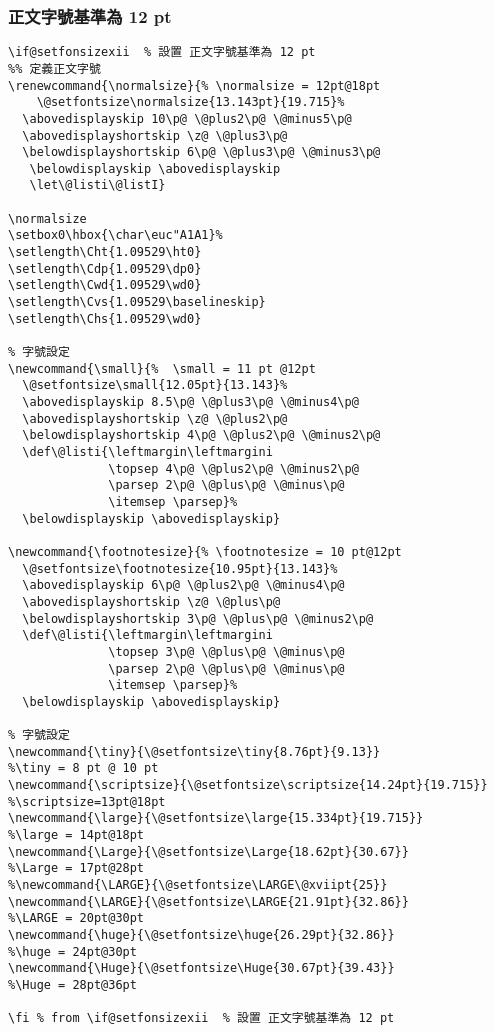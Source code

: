 \subsubsection{正文字號基準為 12 pt}
\begin{lstlisting}[firstnumber=363]
\if@setfonsizexii  % 設置 正文字號基準為 12 pt
%% 定義正文字號
\renewcommand{\normalsize}{% \normalsize = 12pt@18pt
    \@setfontsize\normalsize{13.143pt}{19.715}%
  \abovedisplayskip 10\p@ \@plus2\p@ \@minus5\p@
  \abovedisplayshortskip \z@ \@plus3\p@
  \belowdisplayshortskip 6\p@ \@plus3\p@ \@minus3\p@
   \belowdisplayskip \abovedisplayskip
   \let\@listi\@listI}

\normalsize
\setbox0\hbox{\char\euc"A1A1}%
\setlength\Cht{1.09529\ht0}
\setlength\Cdp{1.09529\dp0}
\setlength\Cwd{1.09529\wd0}
\setlength\Cvs{1.09529\baselineskip}
\setlength\Chs{1.09529\wd0}

% 字號設定
\newcommand{\small}{%  \small = 11 pt @12pt
  \@setfontsize\small{12.05pt}{13.143}%
  \abovedisplayskip 8.5\p@ \@plus3\p@ \@minus4\p@
  \abovedisplayshortskip \z@ \@plus2\p@
  \belowdisplayshortskip 4\p@ \@plus2\p@ \@minus2\p@
  \def\@listi{\leftmargin\leftmargini
              \topsep 4\p@ \@plus2\p@ \@minus2\p@
              \parsep 2\p@ \@plus\p@ \@minus\p@
              \itemsep \parsep}%
  \belowdisplayskip \abovedisplayskip}

\newcommand{\footnotesize}{% \footnotesize = 10 pt@12pt
  \@setfontsize\footnotesize{10.95pt}{13.143}%
  \abovedisplayskip 6\p@ \@plus2\p@ \@minus4\p@
  \abovedisplayshortskip \z@ \@plus\p@
  \belowdisplayshortskip 3\p@ \@plus\p@ \@minus2\p@
  \def\@listi{\leftmargin\leftmargini
              \topsep 3\p@ \@plus\p@ \@minus\p@
              \parsep 2\p@ \@plus\p@ \@minus\p@
              \itemsep \parsep}%
  \belowdisplayskip \abovedisplayskip}

% 字號設定
\newcommand{\tiny}{\@setfontsize\tiny{8.76pt}{9.13}}					 				   %\tiny = 8 pt @ 10 pt
\newcommand{\scriptsize}{\@setfontsize\scriptsize{14.24pt}{19.715}} 	   %\scriptsize=13pt@18pt
\newcommand{\large}{\@setfontsize\large{15.334pt}{19.715}}					     %\large = 14pt@18pt
\newcommand{\Large}{\@setfontsize\Large{18.62pt}{30.67}}				      	 %\Large = 17pt@28pt
%\newcommand{\LARGE}{\@setfontsize\LARGE\@xviipt{25}}
\newcommand{\LARGE}{\@setfontsize\LARGE{21.91pt}{32.86}}  					     %\LARGE = 20pt@30pt
\newcommand{\huge}{\@setfontsize\huge{26.29pt}{32.86}}    				       %\huge = 24pt@30pt
\newcommand{\Huge}{\@setfontsize\Huge{30.67pt}{39.43}}   				    		 %\Huge = 28pt@36pt

\fi % from \if@setfonsizexii  % 設置 正文字號基準為 12 pt
\end{lstlisting}


